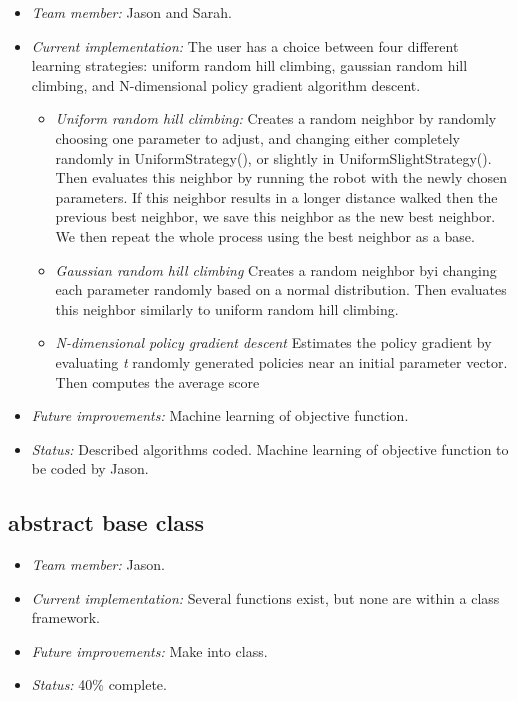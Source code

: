 \begin{itemize}
\item \emph{Team member:} Jason and Sarah.
\item \emph{Current implementation:} The user has a choice between four
  different learning strategies: uniform random hill climbing, gaussian random
  hill climbing, and N-dimensional policy gradient algorithm descent.
  \begin{itemize} 
  \item \emph{Uniform random hill climbing:} Creates a random neighbor by
  randomly choosing one parameter to adjust, and changing either
  completely randomly in UniformStrategy(), or slightly in
  UniformSlightStrategy(). Then evaluates this neighbor by running the robot
  with the newly chosen parameters. If this neighbor results in a
  longer distance walked then the previous best neighbor, we save this
  neighbor as the new best neighbor. We then repeat the whole process
  using the best neighbor as a base.
  \item \emph{Gaussian random hill climbing} Creates a random neighbor byi
  changing each parameter randomly based on a normal distribution. Then
  evaluates this neighbor similarly to uniform random hill climbing.
  \item \emph{N-dimensional policy gradient descent} Estimates the policy
  gradient by evaluating \emph{t} randomly generated policies
  near an initial parameter vector. Then computes the average score 
  \end{itemize}
\item \emph{Future improvements:} Machine learning of objective function.
\item \emph{Status:} Described algorithms coded. Machine learning of objective
  function to be coded by Jason.
\end{itemize}



\subsection*{ abstract base class}

\begin{itemize}
\item \emph{Team member:} Jason.
\item \emph{Current implementation:} Several functions exist, but none are within a class framework.
\item \emph{Future improvements:} Make into class.
\item \emph{Status:} 40\% complete.
\end{itemize}



